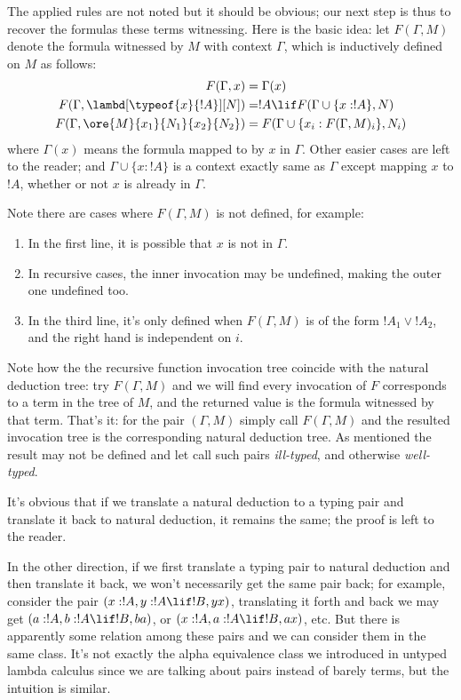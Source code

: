 \documentclass[../../../include/open-logic-section]{subfiles}
\begin{document}
The applied rules  are not noted but it should be obvious; our next
step is thus to recover the formulas these terms witnessing. Here is
the basic idea: let $F(\Gamma,M)$ denote the formula witnessed by
$M$ with context $\Gamma$, which is inductively defined on $M$ as follows:
\begin{align*}
  F(\Gamma, x) &= \Gamma(x) \\
  F(\Gamma, \lambd[\typeof{x}{!A}][N]) &= !A \lif F(\Gamma \cup
  \{x:!A\}, N) \\
  F(\Gamma, \ore{M}{x_1}{N_1}{x_2}{N_2}) &= F(\Gamma \cup
  \{x_i:F(\Gamma, M)_i\}, N_i) 
\end{align*}
where $\Gamma(x)$ means the formula mapped to by $x$ in $\Gamma$.
Other easier cases are left to the reader; and $\Gamma \cup \{x:!A\}$
is a context exactly same as $\Gamma$ except mapping $x$ to $!A$,
whether or not $x$ is already in $\Gamma$.

Note there are cases where $F(\Gamma, M)$ is not defined, for example:
\begin{enumerate}
\item In the first line, it is possible that $x$ is not in $\Gamma$.
\item In recursive cases, the inner invocation may be undefined, making
  the outer one undefined too.
\item In the third line, it's only defined when $F(\Gamma, M)$ is of
  the form $!A_1 \lor !A_2$, and the right hand is independent on $i$.
\end{enumerate}

Note how the the recursive function invocation tree coincide with the natural
deduction tree: try $F(\Gamma, M)$ and we will find every invocation
of $F$ corresponds to a term in the tree of $M$, and the returned
value is the formula witnessed by that term. That's it: for the pair
$(\Gamma, M)$ simply call $F(\Gamma, M)$ and the resulted invocation
tree is the corresponding natural deduction tree. As mentioned the
result may not be defined and let call such pairs \emph{ill-typed},
and otherwise \emph{well-typed}.

It's obvious that if we translate a natural deduction to a
typing pair and translate it back to natural deduction, it remains the
same; the proof is left to the reader.

In the other direction, if we first translate a typing pair to natural
deduction and then translate it back, we won't necessarily get the
same pair back; for example, consider the pair $(x:!A, y:!A \lif !B, y x)$,
translating it forth and back we may get $(a:!A, b:!A \lif !B, b a)$,
or $(x:!A, a:!A \lif !B, a x)$, etc. But there is apparently some
relation among these pairs and we can consider them in the same class.
It's not exactly the alpha equivalence class we introduced in untyped
lambda calculus since we are talking about pairs instead of
barely terms, but the intuition is similar.
\end{document}

